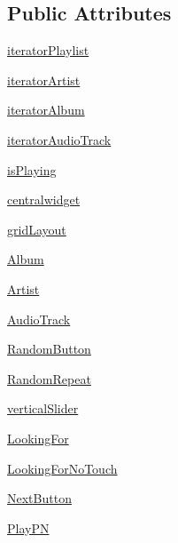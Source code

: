 \subsection*{Public Attributes}
\begin{DoxyCompactItemize}
\item 
\hyperlink{classtestIG_1_1Ui__ProjetGherkin_ace739949aaa21ba49da0888fe83f7f40}{iteratorPlaylist}
\item 
\hyperlink{classtestIG_1_1Ui__ProjetGherkin_a45a1b297b192edf2a2666d189e2ba312}{iteratorArtist}
\item 
\hyperlink{classtestIG_1_1Ui__ProjetGherkin_a4c1600052fb8f3c2c755b9e8da456f4d}{iteratorAlbum}
\item 
\hyperlink{classtestIG_1_1Ui__ProjetGherkin_a2614422704b738136eed479343cf6d8d}{iteratorAudioTrack}
\item 
\hyperlink{classtestIG_1_1Ui__ProjetGherkin_a16797ac825750d2f22ca21483bd73456}{isPlaying}
\item 
\hyperlink{classtestIG_1_1Ui__ProjetGherkin_a1506096764655bd7b458b43603fc25ab}{centralwidget}
\item 
\hyperlink{classtestIG_1_1Ui__ProjetGherkin_ab52c5f44edb32b99404251081be5e10a}{gridLayout}
\item 
\hyperlink{classtestIG_1_1Ui__ProjetGherkin_a408ee3fc559bcc299159663d913b81ff}{Album}
\item 
\hyperlink{classtestIG_1_1Ui__ProjetGherkin_aef8d8aae343cca998d62da52b663c1eb}{Artist}
\item 
\hyperlink{classtestIG_1_1Ui__ProjetGherkin_afbef170d0e081b7b7f5713fb7a064f1e}{AudioTrack}
\item 
\hyperlink{classtestIG_1_1Ui__ProjetGherkin_a3ddeace8a155cc1173f7054dc949d6f9}{RandomButton}
\item 
\hyperlink{classtestIG_1_1Ui__ProjetGherkin_a563cb8a532721342ddb30e9be28071d7}{RandomRepeat}
\item 
\hyperlink{classtestIG_1_1Ui__ProjetGherkin_aff02a675cfb914bd87ab437d32b835ac}{verticalSlider}
\item 
\hyperlink{classtestIG_1_1Ui__ProjetGherkin_a4d9aad12d5c987d0e5f3e0f0721265c8}{LookingFor}
\item 
\hyperlink{classtestIG_1_1Ui__ProjetGherkin_a9c4dbe8eeb064c639a80d57346c6ec7e}{LookingForNoTouch}
\item 
\hyperlink{classtestIG_1_1Ui__ProjetGherkin_a6aff02073c115a1bb4c41e8d435f465a}{NextButton}
\item 
\hyperlink{classtestIG_1_1Ui__ProjetGherkin_a0b77e98a19062ce885bb78cc0dfcc586}{PlayPN}

\end{DoxyCompactItemize}
